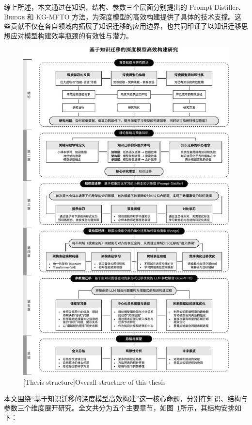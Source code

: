 \documentclass[../main.tex]{subfiles}
\begin{document}
综上所述，本文通过在知识、结构、参数三个层面分别提出的 Prompt-Distiller、\textsc{Bridge} 和 KG-MFTO 方法，为深度模型的高效构建提供了具体的技术支撑。这些贡献不仅在各自领域内拓展了知识迁移的应用边界，也共同印证了以知识迁移思想应对模型构建效率瓶颈的有效性与潜力。

\label{sec:ch1-5-thesis-structure}

\begin{figure}[t]
	\centering
	\includegraphics[width=.92\linewidth]{overall_struction-crop.pdf}
	[Thesis structure]{Overall structure of this thesis}\label{fig:overall_structure}
\end{figure}

本文围绕“基于知识迁移的深度模型高效构建”这一核心命题，分别在知识、结构与参数三个维度展开研究。全文共分为五个主要章节，如图~\ref{fig:overall_structure}所示，其结构安排如下：
\end{document}
